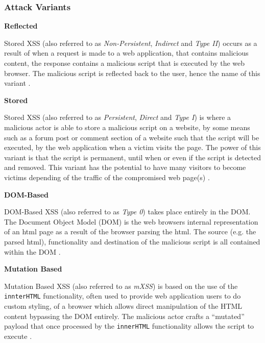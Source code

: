\documentclass{mscreport}
\begin{document}
\subsubsection{Attack Variants}
\textbf{Reflected}

\vspace{0.2cm} \noindent
Stored XSS (also referred to as \textit{Non-Persistent}, \textit{Indirect} and \textit{Type II}) occurs as a result of when a request is made to a web application, that contains malicious content, the response contains a malicious script that is executed by the web browser. The malicious script is reflected back to the user, hence the name of this variant \cite{Rodriguez2020-bg}.

\vspace{0.6cm} \noindent
\textbf{Stored}

\vspace{0.2cm} \noindent
Stored XSS (also referred to as \textit{Persistent}, \textit{Direct} and \textit{Type I}) is where a malicious actor is able to store a malicious script on a website, by some means such as a forum post or comment section of a website such that the script will be executed, by the web application when a victim visits the page. The power of this variant is that the script is permanent, until when or even if the script is detected and removed. This variant has the potential to have many visitors to become victims depending of the traffic of the compromised web page(s) \cite{Rodriguez2020-bg}.

\vspace{0.6cm} \noindent
\textbf{DOM-Based}

\vspace{0.2cm} \noindent
DOM-Based XSS (also referred to as \textit{Type 0}) takes place entirely in the DOM. The Document Object Model (DOM) is the web browsers internal representation of an html page as a result of the browser parsing the html. The source (e.g. the parsed html), functionality and destination of the malicious script is all contained within the DOM \cite{Rodriguez2020-bg,Klein2005-hx}.

\vspace{0.6cm} \noindent
\textbf{Mutation Based}

\vspace{0.2cm} \noindent
Mutation Based XSS (also referred to as \textit{mXSS}) is based on the use of the \texttt{innterHTML} functionality, often used to provide web application users to do custom styling, of a browser which allows direct manipulation of the HTML content bypassing the DOM entirely. The malicious actor crafts a ``mutated'' payload that once processed by the \texttt{innerHTML} functionality allows the script to execute \cite{Heiderich2013-qv}.
\end{document}
